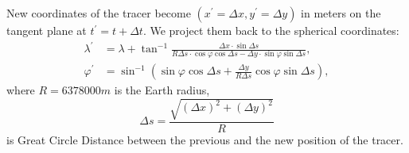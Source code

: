 \documentclass[12pt]{article}
\begin{document}
New coordinates of the tracer become $(x^{\prime}=\Delta x,y^{\prime}=\Delta y)$ in meters on the tangent plane at $t^{\prime}=t+\Delta t$.
We project them back to the spherical coordinates:
\begin{equation}
\begin{aligned}
\lambda^{\prime}&=\lambda+\tan^{-1}{\frac{\Delta x\cdot\sin{\Delta s}}{R\Delta s\cdot\cos{\varphi}\cos{\Delta s}-\Delta y\cdot\sin{\varphi}\sin{\Delta s}}},\\
\varphi^{\prime}&=\sin^{-1}{\left(\sin{\varphi}\cos{\Delta s}+\frac{\Delta y}{R\Delta s}\cos{\varphi}\sin{\Delta s}\right)},
\end{aligned}
\end{equation}
where $R=6378000m$ is the Earth radius,
\begin{equation}
\Delta s=\frac{\sqrt{(\Delta x)^2+(\Delta y)^2}}{R}
\end{equation}
is Great Circle Distance between the previous and the new position of the tracer.
\end{document}
